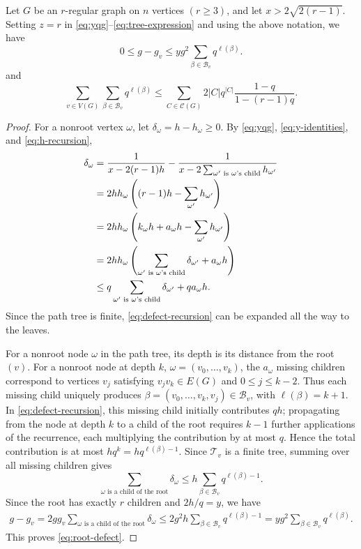 \documentclass[11pt, a4paper]{article}
\begin{document}
\begin{lemma}\label{lem:root-defect}
Let $G$ be an $r$-regular graph on $n$ vertices $(r\ge3)$,
and let $x>2\sqrt{2(r-1)}$.
Setting $z=r$ in \eqref{eq:yqg}--\eqref{eq:tree-expression}
and using the above notation, we have
\begin{equation}\label{eq:root-defect}
 0\leq g-g_v\leq y g^2\sum_{\beta\in\mathcal{B}_v}q^{\ell(\beta)}.
\end{equation}
and
\begin{equation}\label{eq:blocked-count}
 \sum_{v\in V(G)}\sum_{\beta\in\mathcal{B}_v}q^{\ell(\beta)}
 \leq\sum_{C\in\mathcal{C}(G)}
       2|C|q^{|C|}\frac{1-q}{1-(r-1)q}.
\end{equation}
\end{lemma}

\begin{proof}
For a nonroot vertex $\omega$, let $\delta_\omega=h-h_\omega\geq0$.
By \eqref{eq:yqg}, \eqref{eq:y-identities}, and \eqref{eq:h-recursion},
\begin{align}
 \delta_\omega
 &=\frac1{x-2(r-1)h} - \frac1{x-2\sum_{\omega'\text{ is }\omega\text{'s child}}h_{\omega'}} \notag \\
 &=2hh_\omega\left((r-1)h-\sum_{\omega'}h_{\omega'}\right) \notag \\
 &=2hh_\omega\left(k_\omega h+a_\omega h-\sum_{\omega'}h_{\omega'}\right) \notag \\
 &=2hh_\omega\left(\sum_{\omega'\text{ is }\omega\text{'s child}}\delta_{\omega'} + a_\omega h\right) \notag \\
 &\leq q\sum_{\omega'\text{ is }\omega\text{'s child}}\delta_{\omega'} + q a_\omega h. \label{eq:defect-recursion}
\end{align}
Since the path tree is finite, \eqref{eq:defect-recursion} can be expanded all the way to the leaves.

For a nonroot node $\omega$ in the path tree,
its depth is its distance from the root $(v)$.
For a nonroot node at depth $k$,
$\omega=(v_0,\ldots,v_k)$,
the $a_\omega$ missing children correspond to vertices $v_j$ satisfying
$v_jv_k\in E(G)$ and $0\le j\le k-2$.
Thus each missing child uniquely produces
$\beta=(v_0,\ldots,v_k,v_j)\in \mathcal{B}_v$,
with $\ell(\beta)=k+1$.
In \eqref{eq:defect-recursion}, this missing child initially contributes $qh$;
propagating from the node at depth $k$ to a child of the root requires $k-1$ further applications of the recurrence,
each multiplying the contribution by at most $q$. Hence the total contribution is at most
$hq^k=hq^{\ell(\beta)-1}$.
Since $\mathcal{T}_v$ is a finite tree, summing over all missing children gives
\[
 \sum_{\omega\text{ is a child of the root}}\delta_\omega
 \leq h\sum_{\beta\in\mathcal{B}_v}q^{\ell(\beta)-1}.
\]
Since the root has exactly $r$ children and $2h/q=y$, we have
\begin{align*}
 g-g_v
 =2gg_v\sum_{\omega\text{ is a child of the root}}\delta_\omega
 \leq2g^2h\sum_{\beta\in\mathcal{B}_v}q^{\ell(\beta)-1}
 =yg^2\sum_{\beta\in\mathcal{B}_v}q^{\ell(\beta)}.
\end{align*}
This proves \eqref{eq:root-defect}.


\end{proof}
\end{document}
